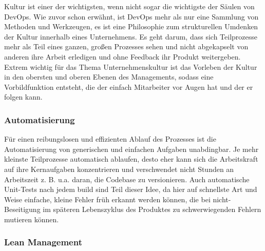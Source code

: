 Kultur ist einer der wichtigsten, wenn nicht sogar die wichtigste der Säulen von \ac{DevOps}. Wie zuvor schon erwähnt, ist \ac{DevOps} mehr als nur eine Sammlung von Methoden und Werkzeugen, es ist eine Philosophie zum strukturellen Umdenken der Kultur innerhalb eines Unternehmens. Es geht darum, dass sich Teilprozesse mehr als Teil eines ganzen, großen Prozesses sehen und nicht abgekapselt von anderen ihre Arbeit erledigen und ohne Feedback ihr Produkt weitergeben. Extrem wichtig für das Thema Unternehmenskultur ist das Vorleben der Kultur in den obersten und oberen Ebenen des Managements, sodass eine Vorbildfunktion entsteht, die der einfach Mitarbeiter vor Augen hat und der er folgen kann.

\subsubsection*{Automatisierung}

Für einen reibungslosen und effizienten Ablauf des Prozesses ist die Automatisierung von generischen und einfachen Aufgaben unabdingbar. Je mehr kleinste Teilprozesse automatisch ablaufen, desto eher kann sich die Arbeitskraft auf ihre Kernaufgaben konzentrieren und verschwendet nicht Stunden an Arbeitszeit z. B. u.a. daran, die Codebase zu versionieren. Auch automatische Unit-Tests nach jedem build sind Teil dieser Idee, da hier auf schnellste Art und Weise einfache, kleine Fehler früh erkannt werden können, die bei nicht-Beseitigung im späteren Lebenszyklus des Produktes zu schwerwiegenden Fehlern mutieren können.

\subsubsection*{Lean Management}

